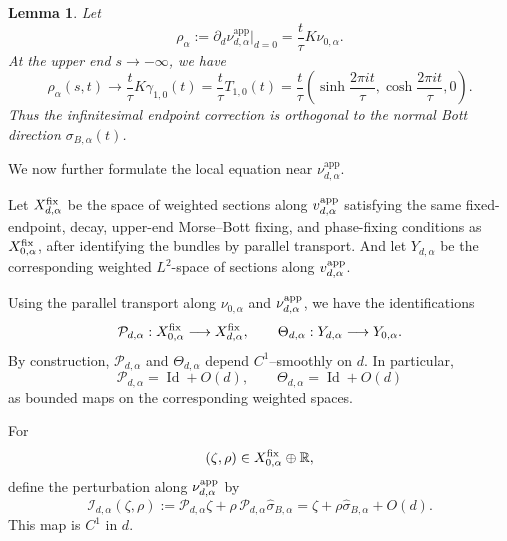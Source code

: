 \documentclass[11pt]{amsart}
\theoremstyle{plain}
\newtheorem{lem}[thm]{Lemma}
\theoremstyle{definition}
\newcommand{\R}{\mathbb{R}}
\begin{document}
\begin{lem}\label{lem:endpoint-correction-orthogonal}
Let
\begin{equation}\label{eq:rho-alpha}
\rho_\alpha
:=\partial_d\nu^{\mathrm{app}}_{d,\alpha}\big|_{d=0}
=\frac{t}{\tau}K\nu_{0,\alpha}.    
\end{equation}
At the upper end $s\to-\infty$, we have
\[
\rho_\alpha(s,t)\longrightarrow
\frac{t}{\tau}K\gamma_{1,0}(t)=\frac{t}{\tau}T_{1,0}(t)
=\frac{t}{\tau}\left(\sinh\frac{2\pi i t}{\tau},
\cosh\frac{2\pi i t}{\tau},0\right).
\]
Thus the infinitesimal endpoint correction is orthogonal to 
the normal Bott direction $\sigma_{B,\alpha}(t)$.
\end{lem}


We now further formulate the local equation near $\nu^{\mathrm{app}}_{d,\alpha}$. 

\smallskip
Let $X^{\rm fix}_{d,\alpha}$ be the space of weighted sections along $v^{\rm app}_{d,\alpha}$ satisfying the same fixed-endpoint, decay,
upper-end Morse--Bott fixing, and phase-fixing conditions as $X^{\rm fix}_{0,\alpha}$, after identifying the bundles by parallel transport.
And let $Y_{d,\alpha}$ be the corresponding weighted $L^2$-space of sections along $v^{\rm app}_{d,\alpha}$.

Using the parallel transport along $\nu_{0,\alpha}$
and $\nu^{\rm app}_{d,\alpha}$, we have the identifications
\[
\mathcal P_{d,\alpha}:X^{\rm fix}_{0,\alpha}\longrightarrow
X^{\rm fix}_{d,\alpha},\qquad \Theta_{d,\alpha}:Y_{d,\alpha}\longrightarrow Y_{0,\alpha}.
\]
By construction, 
$\mathcal P_{d,\alpha}$ and $\Theta_{d,\alpha}$ depend $C^1$--smoothly on
$d$.  In particular,
\[
\mathcal P_{d,\alpha}=\operatorname{Id}+O(d),
\qquad\Theta_{d,\alpha}=\operatorname{Id}+O(d)
\]
as bounded maps on the corresponding weighted spaces.





For
\[
(\zeta,\rho)\in X^{\rm fix}_{0,\alpha}\oplus\R,
\]
define the perturbation along $\nu^{\rm app}_{d,\alpha}$ by
\[
\mathcal I_{d,\alpha}(\zeta,\rho):=
\mathcal P_{d,\alpha}\zeta+
\rho\,\mathcal{P}_{d,\alpha}\widehat\sigma_{B,\alpha}=\zeta+\rho\widehat{\sigma}_{B,\alpha}+O(d).
\]
This map is $C^1$ in $d$.
\end{document}
